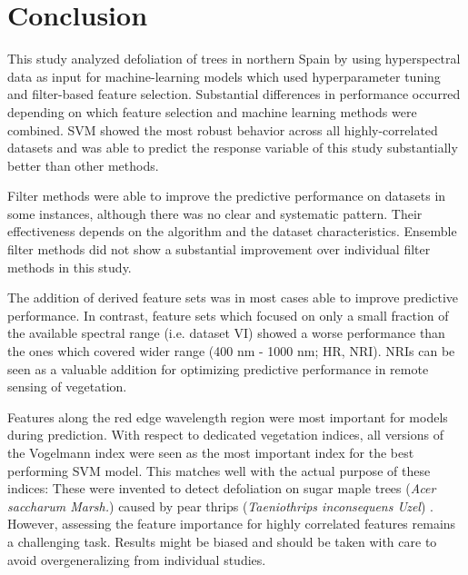 \documentclass[peerreview]{IEEEtran}
\begin{document}
\section{Conclusion}

This study analyzed defoliation of trees in northern Spain by using hyperspectral data as input for machine-learning models which used hyperparameter tuning and filter-based feature selection.
Substantial differences in performance occurred depending on which feature selection and machine learning methods were combined.
SVM showed the most robust behavior across all highly-correlated datasets and was able to predict the response variable of this study substantially better than other methods.

Filter methods were able to improve the predictive performance on datasets in some instances, although there was no clear and systematic pattern.
Their effectiveness depends on the algorithm and the dataset characteristics.
Ensemble filter methods did not show a substantial improvement over individual filter methods in this study.

The addition of derived feature sets was in most cases able to improve predictive performance.
In contrast, feature sets which focused on only a small fraction of the available spectral range (i.e. dataset VI) showed a worse performance than the ones which covered wider range (400 nm - 1000 nm; HR, NRI).
NRIs can be seen as a valuable addition for optimizing predictive performance in remote sensing of vegetation.

Features along the red edge wavelength region were most important for models during prediction.
With respect to dedicated vegetation indices, all versions of the Vogelmann index were seen as the most important index for the best performing SVM model.
This matches well with the actual purpose of these indices:
These were invented to detect defoliation on sugar maple trees (\textit{Acer saccharum Marsh.}) caused by pear thrips (\textit{Taeniothrips inconsequens Uzel}) \cite{vogelmann1993}.
However, assessing the feature importance for highly correlated features remains a challenging task.
Results might be biased and should be taken with care to avoid overgeneralizing from individual studies.
\end{document}
